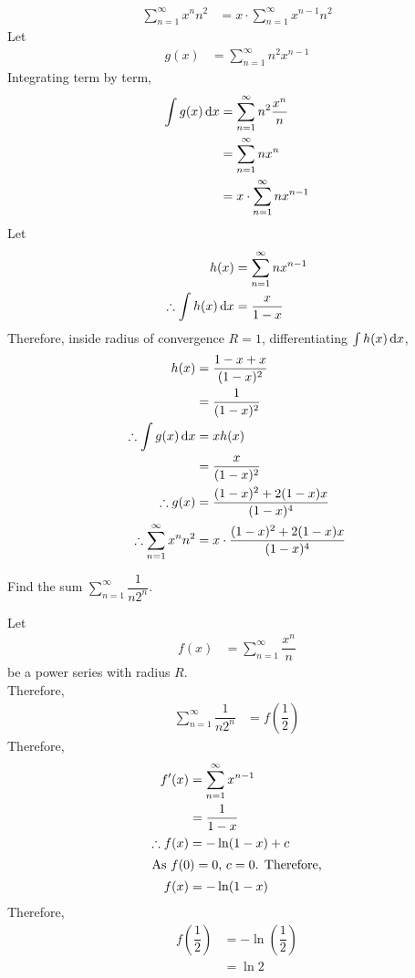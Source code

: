 \documentclass[fleqn, a4paper, 12pt, twoside]{article}
\theoremstyle{definition}
\theoremstyle{theorem}
\begin{document}
\begin{solution}
	\begin{align*}
		\sum\limits_{n = 1}^{\infty} x^n n^2 &= x \cdot \sum\limits_{n = 1}^{\infty} x^{n - 1} n^2
	\end{align*}
	Let
	\begin{align*}
		g(x) &= \sum\limits_{n = 1}^{\infty} n^2 x^{n - 1}
	\end{align*}
	Integrating term by term,
	\begin{align*}
		\int g(x) \dif x &= \sum\limits_{n = 1}^{\infty} n^2 \dfrac{x^n}{n}\\
		&= \sum\limits_{n = 1}^{\infty} n x^n\\
		&= x \cdot \sum\limits_{n = 1}^{\infty} n x^{n - 1}
	\end{align*}
	Let
	\begin{align*}
		h(x) &= \sum\limits_{n = 1}^{\infty} n x^{n - 1}\\
		\therefore \int h(x) \dif x &= \dfrac{x}{1 - x}
	\end{align*}
	Therefore, inside radius of convergence $R = 1$, differentiating $\int h(x) \dif x$,
	\begin{align*}
		h(x) &= \dfrac{1 - x + x}{(1 - x)^2}\\
		&= \dfrac{1}{(1 - x)^2}\\
		\therefore \int g(x) \dif x &= x h(x)\\
		&= \dfrac{x}{(1 - x)^2}\\
		\therefore g(x) &= \dfrac{(1 - x)^2 + 2 (1 - x) x}{(1 - x)^4}\\
		\therefore \sum\limits_{n = 1}^{\infty} x^n n^2 &= x \cdot \dfrac{(1 - x)^2 + 2 (1 - x) x}{(1 - x)^4}
	\end{align*}
\end{solution}

\begin{question}
	Find the sum $\sum\limits_{n = 1}^{\infty} \dfrac{1}{n 2^n}$.
\end{question}

\begin{solution}
	Let
	\begin{align*}
		f(x) &= \sum\limits_{n = 1}^{\infty} \dfrac{x^n}{n}
	\end{align*}
	be a power series with radius $R$.\\
	Therefore,
	\begin{align*}
		\sum\limits_{n = 1}^{\infty} \dfrac{1}{n 2^n} &= f\left( \dfrac{1}{2} \right)
	\end{align*}
	Therefore,
	\begin{align*}
		f'(x) &= \sum\limits_{n = 1}^{\infty} x^{n - 1}\\
		&= \dfrac{1}{1 - x}\\
		\therefore f(x) &= -\ln (1 - x) + c\\
		\intertext{As $f(0) = 0$, $c = 0$. Therefore,}
		f(x) &= -\ln (1 - x)
	\end{align*}
	Therefore,
	\begin{align*}
		f\left( \dfrac{1}{2} \right) &= -\ln \left( \dfrac{1}{2} \right)\\
		&= \ln 2
	\end{align*}
\end{solution}
\end{document}
